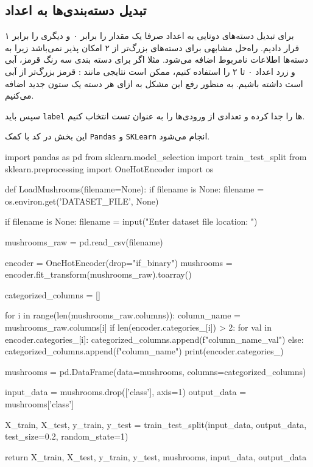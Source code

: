 \subsection{تبدیل دسته‌بندی‌ها به اعداد}
برای تبدیل دسته‌های دوتایی به اعداد صرفا یک مقدار را برابر ۰ و دیگری را برابر ۱ قرار دادیم.
راه‌حل مشابهی برای دسته‌های بزرگ‌تر از ۲ امکان پذیر نمی‌باشد زیرا به دسته‌ها اطلاعات نامربوط اضافه می‌شود.
مثلا اگر برای دسته بندی سه رنگ قرمز، آبی و زرد اعداد ۰ تا ۲ را استفاده کنیم، ممکن است نتایجی مانند : قرمز بزرگ‌تر از آبی است داشته باشیم.
به منظور رفع این مشکل به ازای هر دسته یک ستون جدید اضافه می‌کنیم.

سپس باید
\verb;label;
ها را جدا کرده و تعدادی از ورودی‌ها را به عنوان تست انتخاب کنیم.

این بخش در کد با کمک
\verb;Pandas;
و
\verb;SKLearn;
انجام می‌شود.

\begin{latin}
  \begin{python}
import pandas as pd
from sklearn.model_selection import train_test_split
from sklearn.preprocessing import OneHotEncoder
import os


def LoadMushrooms(filename=None):
    if filename is None:
        filename = os.environ.get('DATASET_FILE', None)

    if filename is None:
        filename = input("Enter dataset file location: ")

    mushrooms_raw = pd.read_csv(filename)

    encoder = OneHotEncoder(drop="if_binary")
    mushrooms = encoder.fit_transform(mushrooms_raw).toarray()

    categorized_columns = []

    for i in range(len(mushrooms_raw.columns)):
        column_name = mushrooms_raw.columns[i]
        if len(encoder.categories_[i]) > 2:
            for val in encoder.categories_[i]:
                categorized_columns.append(f"{column_name}_{val}")
        else:
            categorized_columns.append(f"{column_name}")
    print(encoder.categories_)

    mushrooms = pd.DataFrame(data=mushrooms, columns=categorized_columns)

    input_data = mushrooms.drop(['class'], axis=1)
    output_data = mushrooms['class']


    X_train, X_test, y_train, y_test = train_test_split(input_data, output_data,
            test_size=0.2, random_state=1)

    return X_train, X_test, y_train, y_test, mushrooms, input_data, output_data

 \end{python}
\end{latin}


